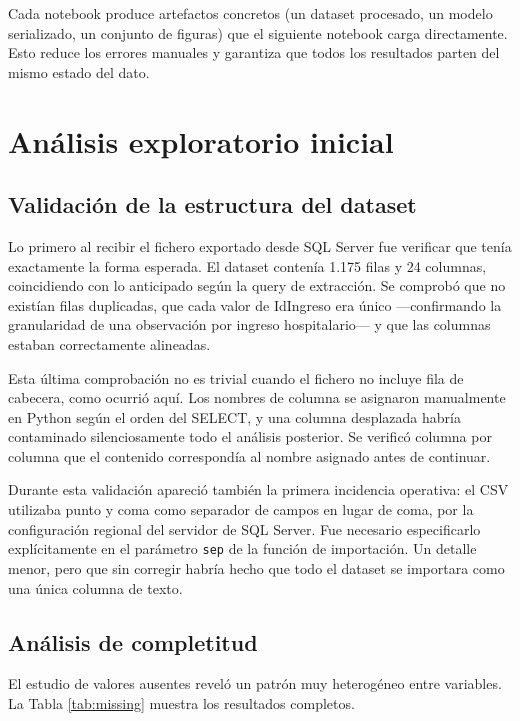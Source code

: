 \documentclass[12pt, a4paper, oneside]{report}
\begin{document}
Cada notebook produce artefactos concretos (un dataset procesado, un modelo serializado, un conjunto de figuras) que el siguiente notebook carga directamente. Esto reduce los errores manuales y garantiza que todos los resultados parten del mismo estado del dato.

\section{Análisis exploratorio inicial}

\subsection{Validación de la estructura del dataset}

Lo primero al recibir el fichero exportado desde SQL Server fue verificar que tenía exactamente la forma esperada. El dataset contenía 1.175 filas y 24 columnas, coincidiendo con lo anticipado según la query de extracción. Se comprobó que no existían filas duplicadas, que cada valor de IdIngreso era único —confirmando la granularidad de una observación por ingreso hospitalario— y que las columnas estaban correctamente alineadas.

Esta última comprobación no es trivial cuando el fichero no incluye fila de cabecera, como ocurrió aquí. Los nombres de columna se asignaron manualmente en Python según el orden del SELECT, y una columna desplazada habría contaminado silenciosamente todo el análisis posterior. Se verificó columna por columna que el contenido correspondía al nombre asignado antes de continuar.

Durante esta validación apareció también la primera incidencia operativa: el CSV utilizaba punto y coma como separador de campos en lugar de coma, por la configuración regional del servidor de SQL Server. Fue necesario especificarlo explícitamente en el parámetro \texttt{sep} de la función de importación. Un detalle menor, pero que sin corregir habría hecho que todo el dataset se importara como una única columna de texto.

\subsection{Análisis de completitud}

El estudio de valores ausentes reveló un patrón muy heterogéneo entre variables. La Tabla \ref{tab:missing} muestra los resultados completos.
\end{document}
